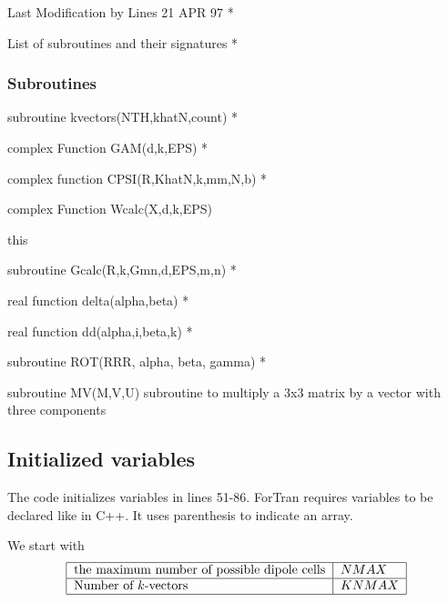 \documentclass{article}
\begin{document}
Last Modification by Lines 21 APR 97 *

List of subroutines and their signatures *

\subsubsection{Subroutines}

subroutine kvectors(NTH,khatN,count) *

complex Function GAM(d,k,EPS) *

complex function CPSI(R,KhatN,k,mm,N,b) *

complex Function Wcalc(X,d,k,EPS)

this

subroutine Gcalc(R,k,Gmn,d,EPS,m,n) *

real function delta(alpha,beta) *

real function dd(alpha,i,beta,k) *

subroutine ROT(RRR, alpha, beta, gamma) *

subroutine MV(M,V,U) subroutine to multiply a 3x3 matrix by a vector with
three components

\subsection{Initialized variables}

The code initializes variables in lines 51-86. ForTran requires variables to
be declared like in C++. It uses parenthesis to indicate an array.

We start with 
\[
\begin{tabular}{|l|l|}
\hline
the maximum number of possible dipole cells & $NMAX$ \\ \hline
Number of $k$-vectors & $KNMAX$ \\ \hline
\end{tabular}%
\]
\end{document}
